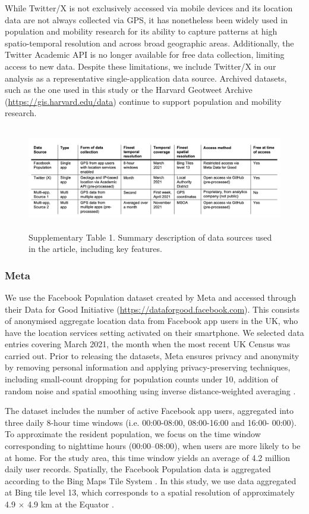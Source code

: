 \documentclass[]{rsos}%
\begin{document}
While Twitter/X is not exclusively accessed via mobile devices and its location data are not always collected via GPS, it has nonetheless been widely used in population and mobility research for its ability to capture patterns at high spatio-temporal resolution and across broad geographic areas. Additionally, the Twitter Academic API is no longer available for free data collection, limiting access to new data. Despite these limitations, we include Twitter/X in our analysis as a representative single-application data source. Archived datasets, such as the one used in this study or the Harvard Geotweet Archive (\url{https://gis.harvard.edu/data}) continue to support population and mobility research.

\begin{figure}
\centering
\includegraphics[width=5.20833in,height=1.77083in]{figures/table-data-source.png}
\caption{Supplementary Table 1. Summary description of data sources used in the
article, including key
features.}
\end{figure}

\hypertarget{meta}{%
\subsubsection{Meta}\label{meta}}

We use the Facebook Population dataset created by Meta and accessed
through their Data for Good Initiative
(\url{https://dataforgood.facebook.com}). This consists of anonymised aggregate location data from Facebook app users in the UK, who
have the location services setting activated on their smartphone. We selected data entries covering March 2021, the month when the most recent UK Census was carried
out. Prior to releasing the datasets,
Meta ensures privacy and anonymity by removing personal information and
applying privacy-preserving techniques, including small-count dropping for population counts under 10, addition of random noise and spatial smoothing using inverse distance-weighted
averaging \citep{maas2019}.

The dataset includes the number of
active Facebook app users, aggregated into three daily 8-hour time windows (i.e.
00:00-08:00, 08:00-16:00 and 16:00- 00:00). To approximate the resident population, we focus on the time window corresponding to nighttime hours (00:00--08:00), when users are more likely to be at home. For the study area, this time window yields an average of 4.2 million daily user records. Spatially, the Facebook Population data is aggregated according to the Bing Maps Tile System \citep{bingmaps_tile_system}. In this study, we use data aggregated at Bing tile level 13, which corresponds to a spatial resolution of approximately 4.9 \(\times\) 4.9 km at the Equator \citep{maas2019}.
\end{document}
